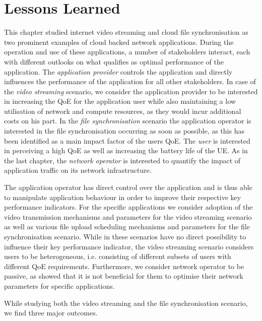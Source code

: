 \section{Lessons Learned}\label{sec:application:lessons_learned}
This chapter studied internet video streaming and cloud file synchronisation as two prominent examples of cloud backed network applications.
During the operation and use of these applications, a number of stakeholders interact, each with different outlooks on what qualifies as optimal performance of the application.
The \emph{application provider} controls the application and directly influences the performance of the application for all other stakeholders.
In case of the \emph{video streaming} scenario, we consider the application provider to be interested in increasing the \gls{QoE} for the application user while also maintaining a low utilisation of network and compute resources, as they would incur additional costs on his part.
In the \emph{file synchronisation} scenario the application operator is interested in the file synchronisation occurring as soon as possible, as this has been identified as a main impact factor of the users \gls{QoE}.
The \emph{user} is interested in perceiving a high \gls{QoE} as well as increasing the battery life of the \gls{UE}.
As in the last chapter, the \emph{network operator} is interested to quantify the impact of application traffic on its network infrastructure.

The application operator has direct control over the application and is thus able to manipulate application behaviour in order to improve their respective key performance indicators.
For the specific applications we consider adoption of the video transmission mechanisms and parameters for the video streaming scenario as well as various file upload scheduling mechanisms and parameters for the file synchronisation scenario.
While in these scenarios have no direct possibility to influence their key performance indicator, the video streaming scenario considers users to be heterogeneous, i.e. consisting of different subsets of users with different \gls{QoE} requirements.
Furthermore, we consider network operator to be passive, as  showed that it is not beneficial for them to optimise their network parameters for specific applications.

While studying both the video streaming and the file synchronisation scenario, we find three major outcomes.

